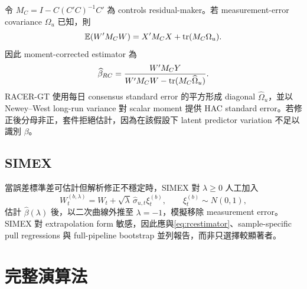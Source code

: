 \documentclass[12pt,a4paper,oneside]{article}
\begin{document}
令 $M_C=I-C(C'C)^{-1}C'$ 為 controls residual-maker。若 measurement-error covariance $\Omega_u$ 已知，則
\begin{equation}
\mathbb{E}(W'M_CW)=X'M_CX+\operatorname{tr}(M_C\Omega_u).
\end{equation}
因此 moment-corrected estimator 為
\begin{equation}
\widehat\beta_{RC}
=\frac{W'M_CY}
{W'M_CW-\operatorname{tr}(M_C\widehat\Omega_u)}.
\label{eq:rcestimator}
\end{equation}
RACER-GT 使用每日 consensus standard error 的平方形成 diagonal $\widehat\Omega_u$，並以 Newey--West long-run variance \cite{neweywest1987} 對 scalar moment 提供 HAC standard error。若修正後分母非正，套件拒絕估計，因為在該假設下 latent predictor variation 不足以識別 $\beta$。

\subsection{SIMEX}

當誤差標準差可估計但解析修正不穩定時，SIMEX \cite{cookstefanski1994,stefanskicook1995,carroll2006} 對 $\lambda\ge0$ 人工加入
\begin{equation}
W_t^{(b,\lambda)}=W_t+\sqrt{\lambda}\,\widehat\sigma_{u,t}\xi_t^{(b)},
\qquad \xi_t^{(b)}\sim N(0,1),
\end{equation}
估計 $\widehat\beta(\lambda)$ 後，以二次曲線外推至 $\lambda=-1$，模擬移除 measurement error。SIMEX 對 extrapolation form 敏感，因此應與\cref{eq:rcestimator}、sample-specific pull regressions 與 full-pipeline bootstrap 並列報告，而非只選擇較顯著者。

\section{完整演算法}
\end{document}
